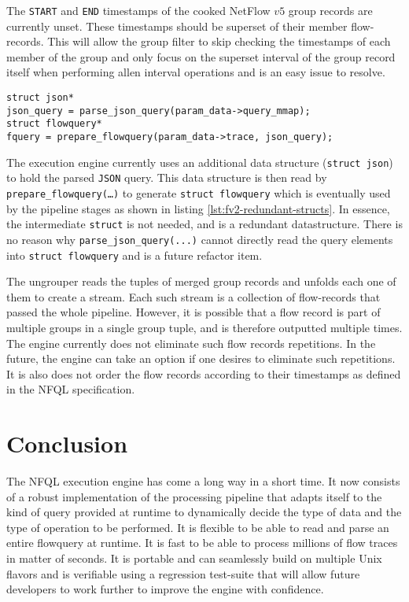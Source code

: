 The \texttt{START} and \texttt{END} timestamps of the cooked NetFlow $v5$
group records are currently unset. These timestamps should be superset of
their member  flow-records.
This will allow the group filter to skip checking the timestamps of each
member of the group and only focus on the superset interval of the group
record itself when performing allen interval operations and is an easy issue
to resolve.

\begin{lstlisting}
struct json*
json_query = parse_json_query(param_data->query_mmap);
struct flowquery*
fquery = prepare_flowquery(param_data->trace, json_query);
\end{lstlisting}

The execution engine currently uses an additional data structure
(\texttt{struct json})  to hold the
parsed \texttt{JSON} query. This data structure is then read by
\texttt{prepare\_flowquery(\ldots)} to generate \texttt{struct flowquery} which
is eventually used by the pipeline stages as shown in listing
\ref{lst:fv2-redundant-structs}. In essence, the intermediate \texttt{struct}
is not needed, and is a redundant datastructure. There is no reason why
\texttt{parse\_json\_query(...)} cannot directly read the query elements into
\texttt{struct flowquery} and is a future refactor item.

The ungrouper reads the tuples of merged group records and unfolds each one of
them to create a stream. Each such stream is a collection of flow-records that
 passed the whole
pipeline. However, it is possible that a flow record is part of multiple
groups in a single group tuple, and is therefore outputted multiple times. The
engine currently does not eliminate such flow records repetitions. In the
future, the engine can take an option if one desires to eliminate such
repetitions. It is also does not order the flow records according to their
timestamps as defined in the \ac{NFQL} specification.


\section{Conclusion}\label{sec:conclusion}

The \ac{NFQL} execution engine has come a long way in a short time. It now
consists of a robust implementation of the processing pipeline that adapts
itself to the kind of query provided at runtime to dynamically decide the type
of data and the type of operation to be performed. It is flexible to be able
to read and parse an entire flowquery at runtime. It is fast to be able to
process millions of flow traces in matter of seconds. It is portable and can
seamlessly build on multiple Unix flavors and is verifiable using a regression
test-suite that will allow future developers to work further to improve the
engine with confidence.
